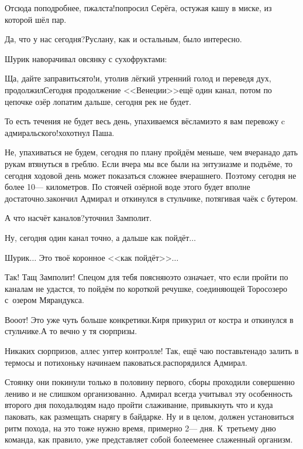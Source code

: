 \diagdash Отсюда поподробнее, п\sdash жалста!\mdash попросил Серёга, остужая кашу в миске, из которой шёл пар.

\diagdash Да, что у нас сегодня?\mdash Руслану, как и остальным, было интересно.

Шурик наворачивал овсянку с сухофруктами:

\diagdash Ща, дайте заправиться\sdash то!\mdash и, утолив лёгкий утренний голод и переведя дух, продолжил\mdash Сегодня продолжение <<Венеции>>\mdash ещё один канал, потом по цепочке озёр лопатим дальше, сегодня рек не будет.

\diagdash То есть течения не будет весь день, упахиваемся вёслами\mdash это я вам перевожу c адмиральского!\mdash хохотнул Паша.

\diagdash Не, упахиваться не будем, сегодня по плану пройдём меньше, чем вчера\mdash надо дать рукам втянуться в греблю. Если вчера мы все были на энтузиазме и подъёме, то сегодня ходовой день может показаться сложнее вчерашнего. Поэтому сегодня не более 10\thinspace\nobreakdash--- километров. По стоячей озёрной воде этого будет вполне достаточно.\mdash закончил Адмирал и откинулся в стульчике, потягивая чаёк с бутером.

\diagdash А что насчёт каналов?\mdash уточнил Замполит.

\diagdash Ну, сегодня один канал точно, а дальше как пойдёт$\ldots$

\diagdash Шурик$\ldots$ Это твоё коронное <<как пойдёт>>$\ldots$

\diagdash Так! Тащ Замполит! Спецом для тебя поясняю\mdash это означает, что если пройти по каналам не удастся, то пойдём по короткой речушке, соединяющей Торосозеро с~озером Мярандукса.

\diagdash Во\sdash о\sdash от! Это уже чуть больше конкретики.\mdash Киря прикурил от костра и откинулся в стульчике.\mdash А то вечно у тя сюрпризы.

\diagdash Никаких сюрпризов, аллес унтер контролле! Так, ещё чаю поставьте\mdash надо залить в термосы и потихоньку начинаем паковаться.\mdash распорядился Адмирал.

Стоянку они покинули только в половину первого, сборы проходили совершенно лениво и не слишком организованно. Адмирал всегда учитывал эту особенность второго дня похода\mdash людям надо пройти слаживание, привыкнуть что и куда паковать, как размещать снарягу в байдарке. Ну и в целом, должен установиться ритм похода, на это тоже нужно время, примерно 2\thinspace\nobreakdash--- дня. К~третьему дню команда, как правило, уже представляет собой более\sdash менее слаженный организм. 

